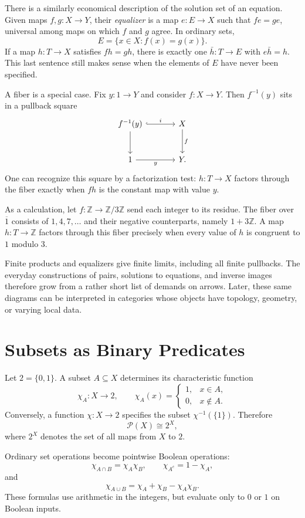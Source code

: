 There is a similarly economical description of the solution set of an equation. Given maps $f,g:X\to Y$, their \emph{equalizer} is a map $e:E\to X$ such that $fe=ge$, universal among maps on which $f$ and $g$ agree. In ordinary sets,
\[
 E=\{x\in X:f(x)=g(x)\}.
\]
If a map $h:T\to X$ satisfies $fh=gh$, there is exactly one $\bar h:T\to E$ with $e\bar h=h$. This last sentence still makes sense when the elements of $E$ have never been specified.

A fiber is a special case. Fix $y:1\to Y$ and consider $f:X\to Y$. Then $f^{-1}(y)$ sits in a pullback square
\[
\begin{tikzcd}[row sep=large,column sep=large]
 f^{-1}(y)\arrow[r,hook,"i"]\arrow[d] & X\arrow[d,"f"]\\
 1\arrow[r,"y"'] &Y.
\end{tikzcd}
\]
One can recognize this square by a factorization test: $h:T\to X$ factors through the fiber exactly when $fh$ is the constant map with value $y$.

As a calculation, let $f:\mathbb Z\to\mathbb Z/3\mathbb Z$ send each integer to its residue. The fiber over $\overline1$ consists of $1,4,7,\ldots$ and their negative counterparts, namely $1+3\mathbb Z$. A map $h:T\to\mathbb Z$ factors through this fiber precisely when every value of $h$ is congruent to $1$ modulo $3$.

Finite products and equalizers give finite limits, including all finite pullbacks. The everyday constructions of pairs, solutions to equations, and inverse images therefore grow from a rather short list of demands on arrows. Later, these same diagrams can be interpreted in categories whose objects have topology, geometry, or varying local data.

\section{Subsets as Binary Predicates}

Let \(2=\{0,1\}\). A subset \(A\subseteq X\) determines its characteristic function
\[
 \chi_A:X\to2,\qquad
 \chi_A(x)=\begin{cases}1,&x\in A,\\0,&x\notin A.\end{cases}
\]
Conversely, a function \(\chi:X\to2\) specifies the subset \(\chi^{-1}(\{1\})\). Therefore
\[
 \boxed{\mathcal P(X)\cong2^X,}
\]
where \(2^X\) denotes the set of all maps from \(X\) to \(2\).

Ordinary set operations become pointwise Boolean operations:
\[
 \chi_{A\cap B}=\chi_A\chi_B,\qquad
 \chi_{A^c}=1-\chi_A,
\]
and
\[
 \chi_{A\cup B}=\chi_A+\chi_B-\chi_A\chi_B.
\]
These formulas use arithmetic in the integers, but evaluate only to \(0\) or \(1\) on Boolean inputs.

